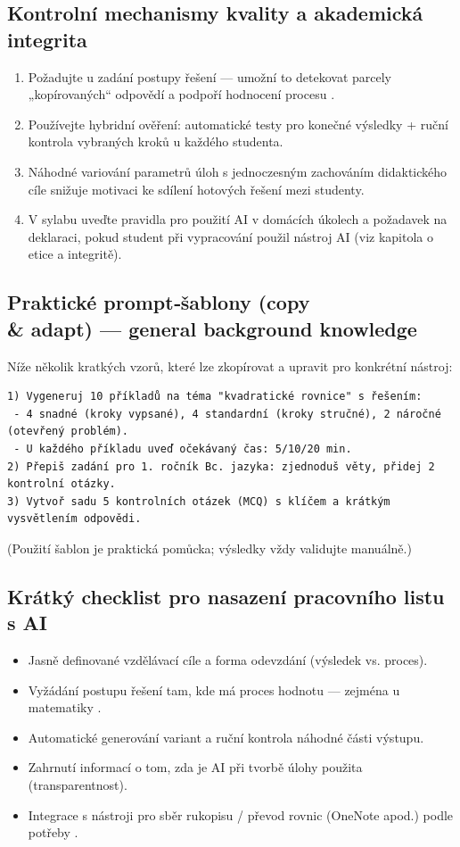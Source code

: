 \subsection*{Kontrolní mechanismy kvality a akademická integrita}
\begin{enumerate}
  \item Požadujte u zadání postupy řešení — umožní to detekovat parcely „kopírovaných“ odpovědí a podpoří hodnocení procesu \cite{kb_ai_101_tipu_pdf_04e4a115_page_8_1}.
  \item Používejte hybridní ověření: automatické testy pro konečné výsledky + ruční kontrola vybraných kroků u každého studenta.
  \item Náhodné variování parametrů úloh s jednoczesným zachováním didaktického cíle snižuje motivaci ke sdílení hotových řešení mezi studenty.
  \item V sylabu uveďte pravidla pro použití AI v domácích úkolech a požadavek na deklaraci, pokud student při vypracování použil nástroj AI (viz kapitola o etice a integritě).
\end{enumerate}

\subsection*{Praktické prompt‑šablony (copy \\ \& adapt) — general background knowledge}
Níže několik kratkých vzorů, které lze zkopírovat a upravit pro konkrétní nástroj:
\begin{verbatim}
1) Vygeneruj 10 příkladů na téma "kvadratické rovnice" s řešením:
 - 4 snadné (kroky vypsané), 4 standardní (kroky stručné), 2 náročné (otevřený problém).
 - U každého příkladu uveď očekávaný čas: 5/10/20 min.
2) Přepiš zadání pro 1. ročník Bc. jazyka: zjednoduš věty, přidej 2 kontrolní otázky.
3) Vytvoř sadu 5 kontrolních otázek (MCQ) s klíčem a krátkým vysvětlením odpovědi.
\end{verbatim}
(Použití šablon je praktická pomůcka; výsledky vždy validujte manuálně.)

\subsection*{Krátký checklist pro nasazení pracovního listu s AI}
\begin{itemize}
  \item Jasně definované vzdělávací cíle a forma odevzdání (výsledek vs. proces).
  \item Vyžádání postupu řešení tam, kde má proces hodnotu — zejména u matematiky \cite{kb_ai_101_tipu_pdf_04e4a115_page_8_1}.
  \item Automatické generování variant a ruční kontrola náhodné části výstupu.
  \item Zahrnutí informací o tom, zda je AI při tvorbě úlohy použita (transparentnost).
  \item Integrace s nástroji pro sběr rukopisu / převod rovnic (OneNote apod.) podle potřeby \cite{kb_ai_101_tipu_pdf_04e4a115_page_8_1}.
\end{itemize}

